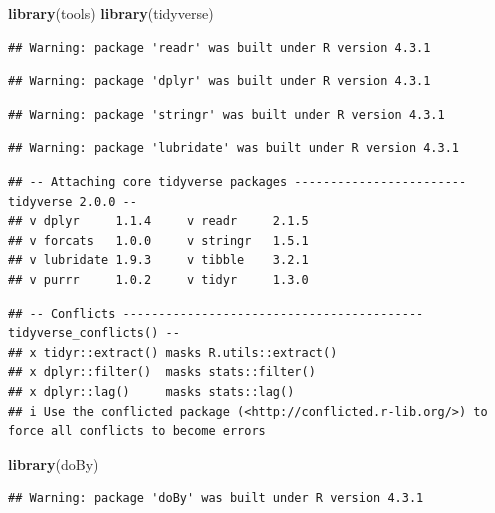 \documentclass[
]{article}
\newenvironment{Shaded}{\begin{snugshade}}{\end{snugshade}}
\newcommand{\FunctionTok}[1]{\textcolor[rgb]{0.13,0.29,0.53}{\textbf{#1}}}
\newcommand{\NormalTok}[1]{#1}
\begin{document}
\begin{Shaded}
\begin{Highlighting}[]
\FunctionTok{library}\NormalTok{(tools)}
\FunctionTok{library}\NormalTok{(tidyverse)}
\end{Highlighting}
\end{Shaded}

\begin{verbatim}
## Warning: package 'readr' was built under R version 4.3.1
\end{verbatim}

\begin{verbatim}
## Warning: package 'dplyr' was built under R version 4.3.1
\end{verbatim}

\begin{verbatim}
## Warning: package 'stringr' was built under R version 4.3.1
\end{verbatim}

\begin{verbatim}
## Warning: package 'lubridate' was built under R version 4.3.1
\end{verbatim}

\begin{verbatim}
## -- Attaching core tidyverse packages ------------------------ tidyverse 2.0.0 --
## v dplyr     1.1.4     v readr     2.1.5
## v forcats   1.0.0     v stringr   1.5.1
## v lubridate 1.9.3     v tibble    3.2.1
## v purrr     1.0.2     v tidyr     1.3.0
\end{verbatim}

\begin{verbatim}
## -- Conflicts ------------------------------------------ tidyverse_conflicts() --
## x tidyr::extract() masks R.utils::extract()
## x dplyr::filter()  masks stats::filter()
## x dplyr::lag()     masks stats::lag()
## i Use the conflicted package (<http://conflicted.r-lib.org/>) to force all conflicts to become errors
\end{verbatim}

\begin{Shaded}
\begin{Highlighting}[]
\FunctionTok{library}\NormalTok{(doBy)}
\end{Highlighting}
\end{Shaded}

\begin{verbatim}
## Warning: package 'doBy' was built under R version 4.3.1
\end{verbatim}
\end{document}

